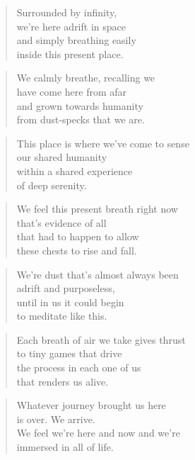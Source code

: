 \documentclass[10pt,a4paper]{article}
\begin{document}
\begin{paracol}{2}


\begin{verse}
Surrounded by infinity,\\
we’re here adrift in space\\
and simply breathing easily\\
inside this present place.
\end{verse}

\begin{verse}
We calmly breathe, recalling we\\
have come here from afar\\
and grown towards humanity\\
from dust-specks that we are.
\end{verse}

\begin{verse}
This place is where we’ve come to sense\\
our shared humanity\\
within a shared experience\\
of deep serenity.
\end{verse}

\begin{verse}
We feel this present breath right now\\
that’s evidence of all\\
that had to happen to allow\\
these chests to rise and fall.
\end{verse}

\begin{verse}
We’re dust that’s almost always been\\
adrift and purposeless,\\
until in us it could begin\\
to meditate like this.
\end{verse}

\begin{verse}
Each breath of air we take gives thrust\\
to tiny games that drive\\
the process in each one of us\\
that renders us alive.
\end{verse}

\begin{verse}
Whatever journey brought us here\\
is over. We arrive.\\
We feel we’re here and now and we’re\\
immersed in all of life.
\end{verse}


\end{paracol}
\end{document}
